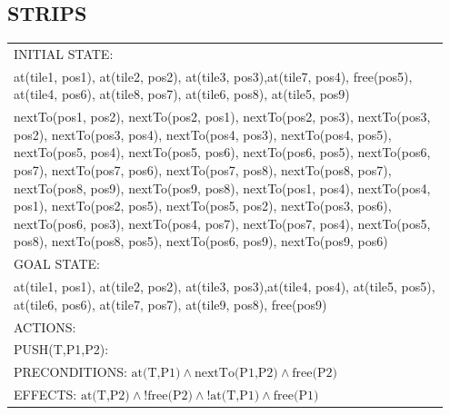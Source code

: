 \documentclass{article}
\begin{document}
\subsection{STRIPS}
\begin{tabular}{|p{0.95\linewidth}|}
\hline
INITIAL STATE:\\
at(tile1, pos1), at(tile2, pos2), at(tile3, pos3),at(tile7, pos4), free(pos5), at(tile4, pos6), at(tile8, pos7), at(tile6, pos8), at(tile5, pos9)\\[3pt]
nextTo(pos1, pos2), nextTo(pos2, pos1), nextTo(pos2, pos3), nextTo(pos3, pos2), nextTo(pos3, pos4), nextTo(pos4, pos3), nextTo(pos4, pos5), nextTo(pos5, pos4), nextTo(pos5, pos6), nextTo(pos6, pos5), nextTo(pos6, pos7), nextTo(pos7, pos6), nextTo(pos7, pos8), nextTo(pos8, pos7), nextTo(pos8, pos9), nextTo(pos9, pos8), nextTo(pos1, pos4), nextTo(pos4, pos1), nextTo(pos2, pos5), nextTo(pos5, pos2), nextTo(pos3, pos6), nextTo(pos6, pos3), nextTo(pos4, pos7), nextTo(pos7, pos4), nextTo(pos5, pos8), nextTo(pos8, pos5), nextTo(pos6, pos9), nextTo(pos9, pos6)
\\\hline
GOAL STATE:\\
at(tile1, pos1), at(tile2, pos2), at(tile3, pos3),at(tile4, pos4), at(tile5, pos5), at(tile6, pos6), at(tile7, pos7), at(tile9, pos8), free(pos9)\\\hline
ACTIONS:\\
\hspace{8pt}PUSH(T,P1,P2):\\
\hspace{16pt}PRECONDITIONS: $\text{at(T,P1)}\land \text{nextTo(P1,P2)}\land \text{free(P2)}$\\
\hspace{16pt}EFFECTS: $\text{at(T,P2)}\land \text{!free(P2)}\land \text{!at(T,P1)}\land \text{free(P1)}$\\\hline
\end{tabular}
\end{document}
